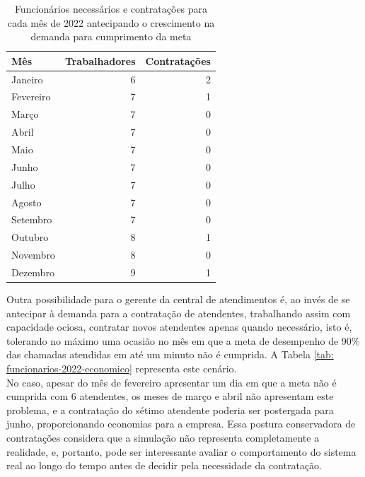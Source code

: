 \begin{table}[H]
    \centering
    \begin{tabular}{|l|r|r|}
    \hline
    \textbf{Mês} & \multicolumn{1}{l|}{\textbf{Trabalhadores}} & \multicolumn{1}{l|}{\textbf{Contratações}} \\ \hline
    Janeiro & 6 & 2 \\ \hline
    Fevereiro & 7 & 1 \\ \hline
    Março & 7 & 0 \\ \hline
    Abril & 7 & 0 \\ \hline
    Maio & 7 & 0 \\ \hline
    Junho & 7 & 0 \\ \hline
    Julho  & 7 & 0 \\ \hline
    Agosto & 7 & 0 \\ \hline
    Setembro & 7 & 0 \\ \hline
    Outubro & 8 & 1 \\ \hline
    Novembro & 8 & 0 \\ \hline
    Dezembro & 9 & 1 \\ \hline
    \end{tabular}
    \caption{Funcionários necessários e contratações para cada mês de 2022 antecipando o crescimento na demanda para cumprimento da meta}
    \label{tab: funcionarios-2022}
    \end{table}
    
Outra possibilidade para o gerente da central de atendimentos é, ao invés de se antecipar à demanda para a contratação de atendentes, trabalhando assim com capacidade ociosa, contratar novos atendentes apenas quando necessário, isto é, tolerando no máximo uma ocasião no mês em que a meta de desempenho de 90\% das chamadas atendidas em até um minuto não é cumprida. A Tabela \ref*{tab: funcionarios-2022-economico} representa este cenário.\\
No caso, apesar do mês de fevereiro apresentar um dia em que a meta não é cumprida com 6 atendentes, os meses de março e abril não apresentam este problema, e a contratação do sétimo atendente poderia ser postergada para junho, proporcionando economias para a empresa. Essa postura conservadora de contratações considera que a simulação não representa completamente a realidade, e, portanto, pode ser interessante avaliar o comportamento do sistema real ao longo do tempo antes de decidir pela necessidade da contratação. 


